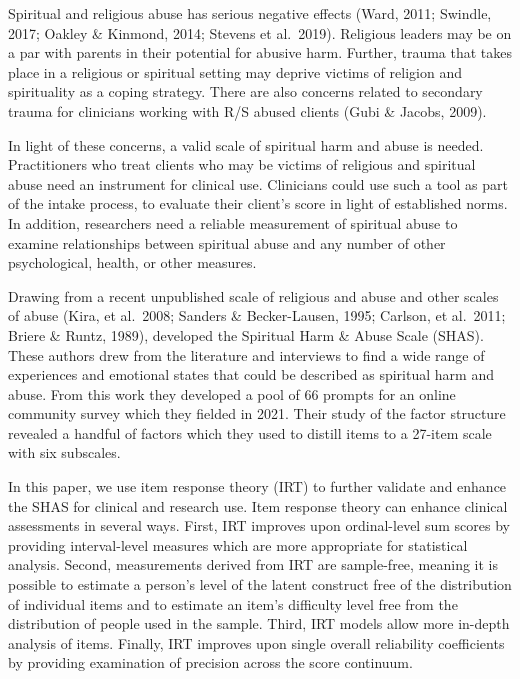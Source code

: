 \documentclass[
]{article}
\begin{document}
Spiritual and religious abuse has serious negative effects (Ward, 2011; Swindle, 2017; Oakley \& Kinmond, 2014; Stevens et al.~2019). Religious leaders may be on a par with parents in their potential for abusive harm. Further, trauma that takes place in a religious or spiritual setting may deprive victims of religion and spirituality as a coping strategy. There are also concerns related to secondary trauma for clinicians working with R/S abused clients (Gubi \& Jacobs, 2009).

In light of these concerns, a valid scale of spiritual harm and abuse is needed. Practitioners who treat clients who may be victims of religious and spiritual abuse need an instrument for clinical use. Clinicians could use such a tool as part of the intake process, to evaluate their client's score in light of established norms. In addition, researchers need a reliable measurement of spiritual abuse to examine relationships between spiritual abuse and any number of other psychological, health, or other measures.

Drawing from a recent unpublished scale of religious and abuse \citep{Keller2016} and other scales of abuse (Kira, et al.~2008; Sanders \& Becker-Lausen, 1995; Carlson, et al.~2011; Briere \& Runtz, 1989), \citet{KochEdstrom2022} developed the Spiritual Harm \& Abuse Scale (SHAS). These authors drew from the literature and interviews to find a wide range of experiences and emotional states that could be described as spiritual harm and abuse. From this work they developed a pool of 66 prompts for an online community survey which they fielded in 2021. Their study of the factor structure revealed a handful of factors which they used to distill items to a 27-item scale with six subscales.

In this paper, we use item response theory (IRT) to further validate and enhance the SHAS for clinical and research use. Item response theory can enhance clinical assessments in several ways. First, IRT improves upon ordinal-level sum scores by providing interval-level measures which are more appropriate for statistical analysis. Second, measurements derived from IRT are sample-free, meaning it is possible to estimate a person's level of the latent construct free of the distribution of individual items and to estimate an item's difficulty level free from the distribution of people used in the sample. Third, IRT models allow more in-depth analysis of items. Finally, IRT improves upon single overall reliability coefficients by providing examination of precision across the score continuum.
\end{document}
